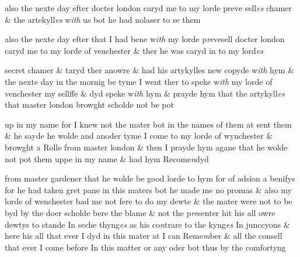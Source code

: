 \documentclass[12pt, a4paper]{book}
\begin{document}
	
				\marginpar[\vspace{0.5cm}{\textcolor{Gray}{n}}]{}
			
	
		\ifthenelse{\isodd{\thepage}}
		{\reversemarginpar}
		{\normalmarginpar}
		also the nexte day efter docter london caryd me to my lorde preve sell\textit{es}
	chamer \& the artekyll\textit{es} w\textit{ith} us bot he had nolaser to se them

 	
				\marginpar[\vspace{0.5cm}{\textcolor{Gray}{n}}]{}
			 
		\ifthenelse{\isodd{\thepage}}
		{\reversemarginpar}
		{\normalmarginpar}
		also the nexte day efter that I had bene w\textit{ith} my lorde p\textit{re}vesell docter london
 	caryd me to my lorde of venchester \& ther he was caryd in to my lord\textit{es}
 	
				\marginpar[\vspace{0.5cm}{\textcolor{Gray}{n}}]{}
			
		\ifthenelse{\isodd{\thepage}}
		{\reversemarginpar}
		{\normalmarginpar}
		secret chamer \& taryd ther anowre  \& had
			 his artykylles new copyde
 w\textit{ith} hym \& the nexte day in the mornig be tyme I went ther to
 	speke w\textit{ith} my lorde of venchester my sellffe \& dyd speke w\textit{ith} hym \& prayde
	hym that the artykyll\textit{es} that master london browght scholde not be pot
	
		
				\marginpar[\vspace{0.5cm}{\textcolor{Gray}{n}}]{}
			
 		
				\marginpar[\vspace{0.5cm}{\textcolor{Gray}{n}}]{}
			
 		
		\ifthenelse{\isodd{\thepage}}
		{\reversemarginpar}
		{\normalmarginpar}
		up in my name for I knew not the mater bot in the names of them at
 			sent them \& he sayde he wolde and anoder tyme I come to my lorde
 				of wynchester \& browght a Rolle from  master
			london \& then I prayde hym agane
 that he wolde not pot them uppe in my name \& had hym Recome\textit{n}dyd
	
 	
 		
				\marginpar[\vspace{0.5cm}{\textcolor{Gray}{n}}]{}
			
 		
				\marginpar[\vspace{0.5cm}{\textcolor{Gray}{n}}]{}
			
 		
		\ifthenelse{\isodd{\thepage}}
		{\reversemarginpar}
		{\normalmarginpar}
		from master gardener that he wolde be good lorde to hym for  of adsion
			 a benifys
 for he had taken gret pane in this maters bot he made me no
 promas \& also my lorde of wenchester bad me not fere to do my dewte
 \& the mater were not to be byd by the doer scholde bere the blame \&
 not the p\textit{re}senter hit his all owre dewtys to stande In seche thyng\textit{es}
 as his co\textit{n}trare to the kyng\textit{es} In junccyons \& here his all that ever
 I dyd in this mater at I can Reme\textit{m}ber \& all the consell that ever
 I come before In this matter or any oder bot thus by the comfortyng
 	
\end{document}
